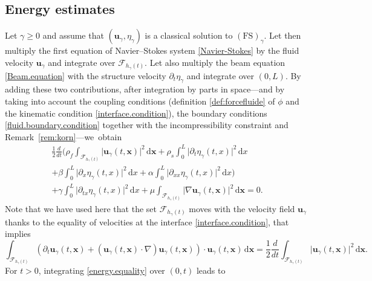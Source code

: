 \documentclass[JEP,XML,SOM,Unicode,NoFloatCountersInSection]{cedram}
\let\mathcal\mathscr
\newcommand{\FS}{\mathrm{FS}}
\theoremstyle{remark}
\theoremstyle{definition}
\newcommand{\ug}{\boldsymbol{u}}
\newcommand{\xg}{\boldsymbol{x}}
\newcommand{\dd}{\,\mathrm{d}}
\begin{document}
\subsection{Energy estimates}
Let $\gamma \geq 0 $ and assume that $(\ug_\gamma, \eta_\gamma)$ is a classical solution to $(\FS)_{\gamma}$. Let then multiply the first equation of Navier--Stokes system \eqref{Navier-Stokes} by the fluid velocity $\ug_\gamma$ and integrate over $\mathcal{F}_{h_\gamma(t)}$. Let also multiply the beam equation \eqref{Beam.equation} with the structure velocity $\partial_t\eta_{\gamma}$ and integrate over $(0, L)$. By adding these two contributions, after integration by parts in space---and by taking into account the coupling conditions (definition \eqref{def:forcefluide} of $\phi$ and the kinematic condition \eqref{interface.condition}), the boundary conditions \eqref{fluid.boundary.condition} together with the incompressibility constraint and Remark~\ref{rem:korn}---we~obtain
\begin{multline}\label{energy.equality}
\frac{1}{2}\frac{d}{dt}\biggl(\rho_{f}\int_{\mathcal{F}_{h_{\gamma}(t)}}\vert\ug_{\gamma}(t, \xg) \vert^{2} \dd\xg+ \rho_{s}\int_{0}^{L}\vert\partial_{t}\eta_{\gamma}(t, x) \vert^{2}\dd x \\
 +\beta\int_{0}^{L}\vert\partial_{x}\eta_{\gamma}(t, x) \vert^{2}\dd x+\alpha\int_{0}^{L}\vert\partial_{xx}\eta_{\gamma}(t, x)\vert^{2} \dd x\biggr)\\
 +\gamma\int_{0}^{L}\vert\partial_{tx}\eta_{\gamma}(t, x)\vert^{2} \dd x+ \mu\int_{\mathcal{F}_{h_{\gamma}(t)}}\vert \nabla\ug_{\gamma}(t, \xg) \vert^{2}\dd \xg=0.
\end{multline}
Note that we have used here that the set ${\mathcal{F}_{h_{\gamma}(t)}}$ moves with the velocity field $\ug_{\gamma}$ thanks to the equality of velocities at the interface \eqref{interface.condition}, that implies
\[
\int_{\mathcal{F}_{h_{\gamma}(t)}}(\partial_t\ug_\gamma(t, \xg)+(\ug_{\gamma}(t, \xg)\cdot\nabla )\ug_{\gamma}(t, \xg))\cdot \ug_{\gamma}(t, \xg)\dd\xg = \frac{1}{2}\frac{d}{dt}\int_{\mathcal{F}_{h_{\gamma}(t)}}\vert\ug_{\gamma}(t, \xg) \vert^{2} \dd\xg.
\]
For $t >0$, integrating \eqref{energy.equality} over $(0, t)$ leads to
\end{document}
